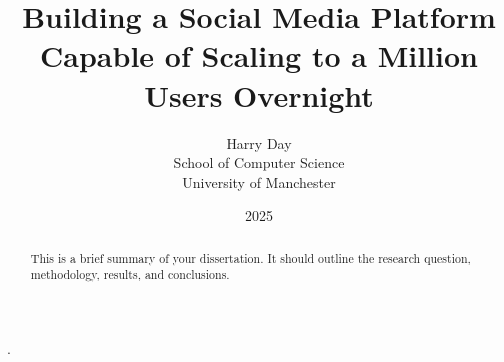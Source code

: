 \documentclass[12pt,a4paper]{report}
\title{Building a Social Media Platform Capable of Scaling to a Million Users Overnight}
\author{Harry Day\\School of Computer Science\\University of Manchester}
\date{2025}
\makeatletter
\def\@supervisor{}
\renewcommand{\maketitle}{
  \begin{titlepage}
    \centering
    {\Large \bfseries \@title \par}
    \vskip 1.5cm
    {\large \@author \par}
    \vskip 0.5cm
    {\large \@supervisor \par}
    \vskip 0.5cm
    {\large \@date \par}
    \vfill
  \end{titlepage}
}
\makeatother
\begin{document}
\maketitle

\begin{abstract}
  This is a brief summary of your dissertation. It should outline the research question, methodology, results, and conclusions. 
\end{abstract}

\tableofcontents
\listoffigures
\listoftables







\citep{capinski2012black}.







\end{document}

